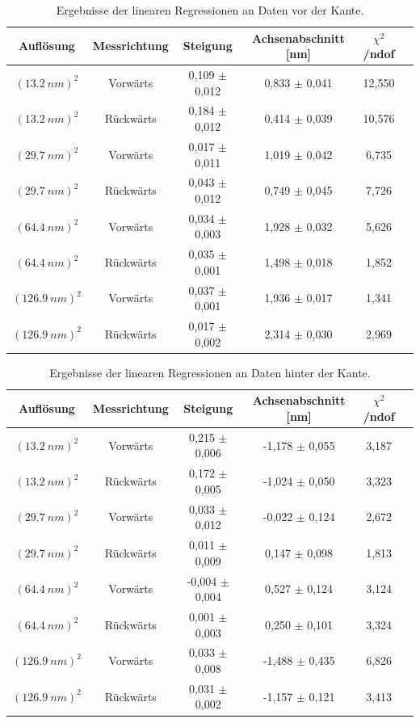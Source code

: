 \documentclass[12pt,a4paper]{article}
\begin{document}
\begin{table}
\centering
\begin{tabular}{|c|c|c|c|c|c|}
\hline 
Auflösung & Messrichtung & Steigung & Achsenabschnitt [nm] & $\chi ^2$/ndof \\ 
\hline 
$(\SI{13,2}{nm})^2$ & Vorwärts & 0,109 $\pm$ 0,012 & 0,833 $\pm$ 0,041 & 12,550 \\
\hline 
$(\SI{13,2}{nm})^2$ & Rückwärts & 0,184 $\pm$ 0,012 & 0,414 $\pm$ 0,039 & 10,576\\
\hline 
$(\SI{29,7}{nm})^2$ & Vorwärts & 0,017 $\pm$ 0,011 & 1,019 $\pm$ 0,042 & 6,735 \\
\hline 
$(\SI{29,7}{nm})^2$ & Rückwärts & 0,043 $\pm$ 0,012 & 0,749 $\pm$ 0,045 & 7,726\\
\hline 
$(\SI{64,4}{nm})^2$ & Vorwärts & 0,034 $\pm$ 0,003 & 1,928 $\pm$ 0,032 & 5,626 \\
\hline 
$(\SI{64,4}{nm})^2$ & Rückwärts & 0,035 $\pm$ 0,001 & 1,498 $\pm$ 0,018 & 1,852\\
\hline 
$(\SI{126,9}{nm})^2$ & Vorwärts & 0,037 $\pm$ 0,001 & 1,936 $\pm$ 0,017 & 1,341 \\
\hline 
$(\SI{126,9}{nm})^2$ & Rückwärts & 0,017 $\pm$ 0,002 & 2,314 $\pm$ 0,030 & 2,969\\
\hline
\end{tabular} 
\caption{Ergebnisse der linearen Regressionen an Daten vor der Kante.}
\label{tab:Kante_linreg_vor_Ergebnisse}
\end{table}

\begin{table}
\centering
\begin{tabular}{|c|c|c|c|c|c|}
\hline 
Auflösung & Messrichtung & Steigung & Achsenabschnitt [nm] & $\chi ^2$/ndof \\ 
\hline 
$(\SI{13,2}{nm})^2$ & Vorwärts & 0,215 $\pm$ 0,006 & -1,178 $\pm$ 0,055 & 3,187 \\
\hline 
$(\SI{13,2}{nm})^2$ & Rückwärts & 0,172 $\pm$ 0,005 & -1,024 $\pm$ 0,050 & 3,323\\
\hline 
$(\SI{29,7}{nm})^2$ & Vorwärts & 0,033 $\pm$ 0,012 & -0,022 $\pm$ 0,124 & 2,672  \\
\hline 
$(\SI{29,7}{nm})^2$ & Rückwärts & 0,011 $\pm$ 0,009 & 0,147 $\pm$ 0,098 & 1,813\\
\hline 
$(\SI{64,4}{nm})^2$ & Vorwärts & -0,004 $\pm$ 0,004 & 0,527 $\pm$ 0,124 & 3,124\\
\hline 
$(\SI{64,4}{nm})^2$ & Rückwärts & 0,001 $\pm$ 0,003 & 0,250 $\pm$ 0,101 & 3,324\\
\hline 
$(\SI{126,9}{nm})^2$ & Vorwärts & 0,033 $\pm$ 0,008 & -1,488 $\pm$ 0,435 & 6,826\\
\hline 
$(\SI{126,9}{nm})^2$ & Rückwärts & 0,031 $\pm$ 0,002 & -1,157 $\pm$ 0,121 & 3,413\\
\hline 
\end{tabular} 
\caption{Ergebnisse der linearen Regressionen an Daten hinter der Kante.}
\label{tab:Kante_linreg_nach_Ergebnisse}
\end{table}
\end{document}
